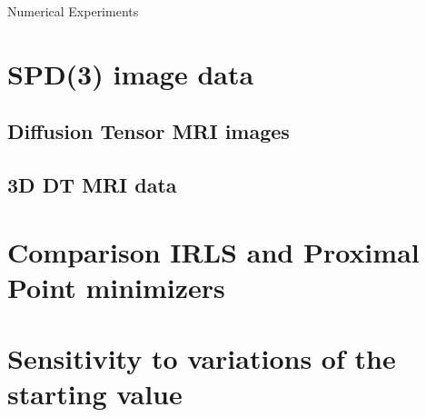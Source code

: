 \begin{chapter}{Numerical Experiments}


\section{SPD(3) image data} %
\label{sec:SPD(3) image data}

\subsection{Diffusion Tensor MRI images} %
\label{sub:Diffusion Tensor MRI images}

\subsection{3D DT MRI data} %
\label{sub:3D DT MRI data}


\section{Comparison IRLS and Proximal Point minimizers} %
\label{sec:Comparison IRLS and Proximal Point minimizers}


\section{Sensitivity to variations of the starting value} %
\label{sec:Sensitivity to variations of the starting value}


\end{chapter}

